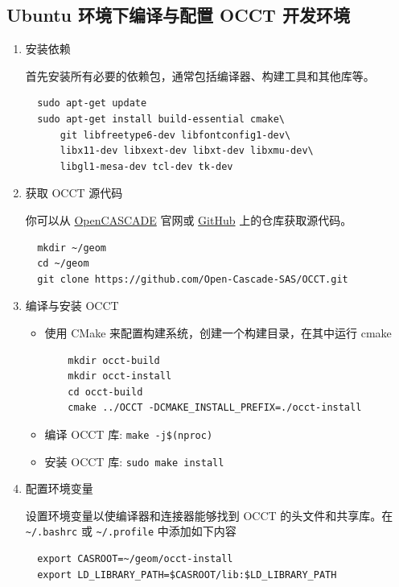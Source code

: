 \documentclass[11pt]{article}
\begin{document}
\subsection{Ubuntu 环境下编译与配置 OCCT 开发环境}
\label{sec:org8b89026}

\begin{enumerate}
\item 安装依赖

首先安装所有必要的依赖包，通常包括编译器、构建工具和其他库等。

\begin{verbatim}
  sudo apt-get update
  sudo apt-get install build-essential cmake\
      git libfreetype6-dev libfontconfig1-dev\
      libx11-dev libxext-dev libxt-dev libxmu-dev\
      libgl1-mesa-dev tcl-dev tk-dev
\end{verbatim}

\item 获取 OCCT 源代码

你可以从 \href{https://dev.opencascade.org/release}{OpenCASCADE} 官网或 \href{https://github.com/Open-Cascade-SAS/OCCT}{GitHub} 上的仓库获取源代码。

\begin{verbatim}
  mkdir ~/geom
  cd ~/geom
  git clone https://github.com/Open-Cascade-SAS/OCCT.git
\end{verbatim}

\item 编译与安装 OCCT

\begin{itemize}
\item 使用 CMake 来配置构建系统，创建一个构建目录，在其中运行 cmake

\begin{verbatim}
    mkdir occt-build
    mkdir occt-install
    cd occt-build
    cmake ../OCCT -DCMAKE_INSTALL_PREFIX=./occt-install
\end{verbatim}

\item 编译 OCCT 库: \texttt{make -j\$(nproc)}
\item 安装 OCCT 库: \texttt{sudo make install}
\end{itemize}

\item 配置环境变量

设置环境变量以使编译器和连接器能够找到 OCCT 的头文件和共享库。在 \texttt{\textasciitilde{}/.bashrc} 或 \texttt{\textasciitilde{}/.profile} 中添加如下内容

\begin{verbatim}
  export CASROOT=~/geom/occt-install
  export LD_LIBRARY_PATH=$CASROOT/lib:$LD_LIBRARY_PATH
\end{verbatim}
\end{enumerate}
\end{document}
